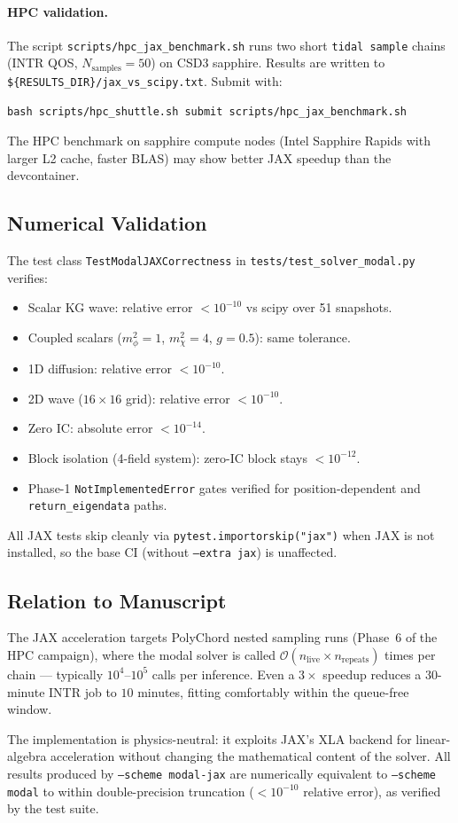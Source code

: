 \paragraph{HPC validation.}
The script \texttt{scripts/hpc\_jax\_benchmark.sh} runs two short
\texttt{tidal sample} chains (INTR QOS, $N_{\mathrm{samples}}=50$) on
CSD3 sapphire.  Results are written to
\texttt{\$\{RESULTS\_DIR\}/jax\_vs\_scipy.txt}.  Submit with:
\begin{verbatim}
bash scripts/hpc_shuttle.sh submit scripts/hpc_jax_benchmark.sh
\end{verbatim}
The HPC benchmark on sapphire compute nodes (Intel Sapphire Rapids with
larger L2 cache, faster BLAS) may show better JAX speedup than the
devcontainer.

\subsection{Numerical Validation}
\label{sec:modal_jax_validation}

The test class \texttt{TestModalJAXCorrectness} in
\texttt{tests/test\_solver\_modal.py} verifies:

\begin{itemize}
  \item Scalar KG wave: relative error $<10^{-10}$ vs scipy over 51 snapshots.
  \item Coupled scalars ($m_\phi^2=1$, $m_\chi^2=4$, $g=0.5$): same tolerance.
  \item 1D diffusion: relative error $<10^{-10}$.
  \item 2D wave ($16\times16$ grid): relative error $<10^{-10}$.
  \item Zero IC: absolute error $<10^{-14}$.
  \item Block isolation (4-field system): zero-IC block stays $<10^{-12}$.
  \item Phase-1 \texttt{NotImplementedError} gates verified for
    position-dependent and \texttt{return\_eigendata} paths.
\end{itemize}

All JAX tests skip cleanly via \texttt{pytest.importorskip("jax")} when JAX
is not installed, so the base CI (without \texttt{--extra jax}) is unaffected.

\subsection{Relation to Manuscript}
\label{sec:modal_jax_manuscript}

The JAX acceleration targets PolyChord nested sampling runs (Phase~6 of the
HPC campaign), where the modal solver is called $\mathcal{O}(n_{\mathrm{live}}
\times n_{\mathrm{repeats}})$ times per chain — typically $10^4$--$10^5$
calls per inference.  Even a $3\times$ speedup reduces a $30$-minute INTR
job to $10$ minutes, fitting comfortably within the queue-free window.

The implementation is physics-neutral: it exploits JAX's XLA backend for
linear-algebra acceleration without changing the mathematical content of
the solver.  All results produced by \texttt{--scheme modal-jax} are
numerically equivalent to \texttt{--scheme modal} to within double-precision
truncation ($<10^{-10}$ relative error), as verified by the test suite.
